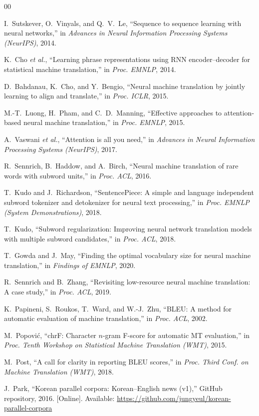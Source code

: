 \documentclass[conference]{IEEEtran}
\begin{document}
\begin{thebibliography}{00}

 I.~Sutskever, O.~Vinyals, and Q.~V.~Le,
``Sequence to sequence learning with neural networks,'' in
\emph{Advances in Neural Information Processing Systems (NeurIPS)}, 2014.

 K.~Cho \emph{et al.},
``Learning phrase representations using RNN encoder--decoder for statistical
machine translation,'' in \emph{Proc. EMNLP}, 2014.

 D.~Bahdanau, K.~Cho, and Y.~Bengio,
``Neural machine translation by jointly learning to align and translate,'' in
\emph{Proc. ICLR}, 2015.

 M.-T.~Luong, H.~Pham, and C.~D.~Manning,
``Effective approaches to attention-based neural machine translation,'' in
\emph{Proc. EMNLP}, 2015.

 A.~Vaswani \emph{et al.},
``Attention is all you need,'' in
\emph{Advances in Neural Information Processing Systems (NeurIPS)}, 2017.

 R.~Sennrich, B.~Haddow, and A.~Birch,
``Neural machine translation of rare words with subword units,'' in
\emph{Proc. ACL}, 2016.

 T.~Kudo and J.~Richardson,
``SentencePiece: A simple and language independent subword tokenizer and
detokenizer for neural text processing,'' in
\emph{Proc. EMNLP (System Demonstrations)}, 2018.

 T.~Kudo,
``Subword regularization: Improving neural network translation models with
multiple subword candidates,'' in \emph{Proc. ACL}, 2018.

 T.~Gowda and J.~May,
``Finding the optimal vocabulary size for neural machine translation,'' in
\emph{Findings of EMNLP}, 2020.

 R.~Sennrich and B.~Zhang,
``Revisiting low-resource neural machine translation: A case study,'' in
\emph{Proc. ACL}, 2019.

 K.~Papineni, S.~Roukos, T.~Ward, and W.-J.~Zhu,
``BLEU: A method for automatic evaluation of machine translation,'' in
\emph{Proc. ACL}, 2002.

 M.~Popovi\'c,
``chrF: Character $n$-gram F-score for automatic MT evaluation,'' in
\emph{Proc. Tenth Workshop on Statistical Machine Translation (WMT)}, 2015.

 M.~Post,
``A call for clarity in reporting BLEU scores,'' in
\emph{Proc. Third Conf. on Machine Translation (WMT)}, 2018.

 J.~Park, ``Korean parallel corpora: Korean--English news
(v1),'' GitHub repository, 2016. [Online]. Available:
\url{https://github.com/jungyeul/korean-parallel-corpora}

\end{thebibliography}
\end{document}
